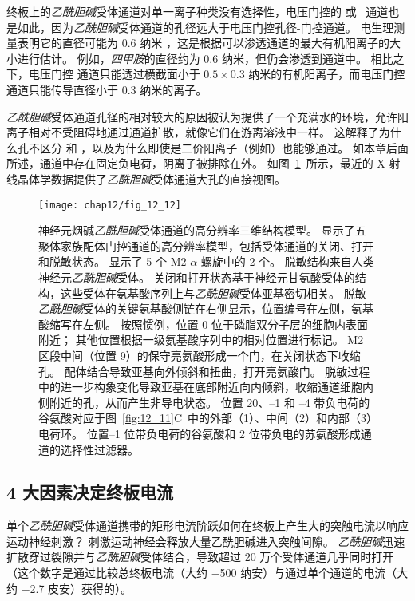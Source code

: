 终板上的\textit{乙酰胆碱}受体通道对单一离子种类没有选择性，电压门控的  或~ 通道也是如此，因为\textit{乙酰胆碱}受体通道的孔径远大于电压门控孔径-门控通道。
电生理测量表明它的直径可能为 0.6 纳米 ，这是根据可以渗透通道的最大有机阳离子的大小进行估计。
例如，\textit{四甲胺}的直径约为 0.6 纳米，但仍会渗透到通道中。
相比之下，电压门控  通道只能透过横截面小于 $ 0.5 \times 0.3 $ 纳米的有机阳离子，而电压门控  通道只能传导直径小于 0.3 纳米的离子。


\textit{乙酰胆碱}受体通道孔径的相对较大的原因被认为提供了一个充满水的环境，允许阳离子相对不受阻碍地通过通道扩散，就像它们在游离溶液中一样。
这解释了为什么孔不区分  和 ，以及为什么即使是二价阳离子（例如）也能够通过。
如本章后面所述，通道中存在固定负电荷，阴离子被排除在外。
如图~\ref{fig:12_12}~所示，最近的 X 射线晶体学数据提供了\textit{乙酰胆碱}受体通道大孔的直接视图。


\begin{figure}[htbp]
	\centering
	\texttt{[image: chap12/fig\_12\_12]}
	\caption{神经元烟碱\textit{乙酰胆碱}受体通道的高分辨率三维结构模型。
		显示了五聚体家族配体门控通道的高分辨率模型，包括受体通道的关闭、打开和脱敏状态。
		显示了 5 个 M2 $\alpha$-螺旋中的 2 个。
		脱敏结构来自人类神经元\textit{乙酰胆碱}受体。
		关闭和打开状态基于神经元甘氨酸受体的结构，这些受体在氨基酸序列上与\textit{乙酰胆碱}受体亚基密切相关。
		脱敏\textit{乙酰胆碱}受体的关键氨基酸侧链在右侧显示，位置编号在左侧，氨基酸缩写在左侧。
		按照惯例，位置 0 位于磷脂双分子层的细胞内表面附近；
		其他位置根据一级氨基酸序列中的相对位置进行标记。
		M2 区段中间（位置 9）的保守亮氨酸形成一个门，在关闭状态下收缩孔。
		配体结合导致亚基向外倾斜和扭曲，打开亮氨酸门。
		脱敏过程中的进一步构象变化导致亚基在底部附近向内倾斜，收缩通道细胞内侧附近的孔，从而产生非导电状态。
		位置 20、–1 和 –4 带负电荷的谷氨酸对应于图~\ref{fig:12_11}C~中的外部（1）、中间（2）和内部（3）电荷环。
		位置–1 位带负电荷的谷氨酸和 2 位带负电的苏氨酸形成通道的选择性过滤器\cite{morales2016x}。}
	\label{fig:12_12}
\end{figure}



\subsection{4 大因素决定终板电流}

单个\textit{乙酰胆碱}受体通道携带的矩形电流阶跃如何在终板上产生大的突触电流以响应运动神经刺激？
刺激运动神经会释放大量乙酰胆碱进入突触间隙。
\textit{乙酰胆碱}迅速扩散穿过裂隙并与\textit{乙酰胆碱}受体结合，导致超过 20 万个受体通道几乎同时打开（这个数字是通过比较总终板电流（大约 −500 纳安）与通过单个通道的电流（大约 −2.7 皮安）获得的）。


